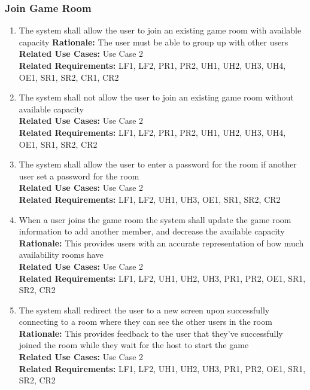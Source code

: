 \documentclass[12pt]{article}
\begin{document}
\subsubsection{Join Game Room}
\begin{enumerate}[label=JG\arabic*., series=JoinGame]
	\item The system shall allow the user to join an existing game room with available capacity \newline 
    \textbf{Rationale:} The user must be able to group up with other users\\
    \textbf{Related Use Cases:} Use Case 2\\
    \textbf{Related Requirements:} LF1, LF2, PR1, PR2, UH1, UH2, UH3, UH4, OE1, SR1, SR2, CR1, CR2
    
    \item The system shall not allow the user to join an existing game room without available capacity\\
    \textbf{Related Use Cases:} Use Case 2\\
    \textbf{Related Requirements:} LF1, LF2, PR1, PR2, UH1, UH2, UH3, UH4, OE1, SR1, SR2, CR2
    
    \item The system shall allow the user to enter a password for the room if another user set a password for the room\\
    \textbf{Related Use Cases:} Use Case 2\\
    \textbf{Related Requirements:} LF1, LF2, UH1, UH3, OE1, SR1, SR2, CR2
    \item When a user joins the game room the system shall update the game room information to add another member, and decrease the available capacity\\
    \textbf{Rationale:} This provides users with an accurate representation of how much availability rooms have\\
    \textbf{Related Use Cases:} Use Case 2\\
    \textbf{Related Requirements:} LF1, LF2, UH1, UH2, UH3, PR1, PR2, OE1, SR1, SR2, CR2
    
    \item The system shall redirect the user to a new screen upon successfully connecting to a room where they can see the other users in the room\newline 
    \textbf{Rationale:} This provides feedback to the user that they've successfully joined the room while they wait for the host to start the game\\
    \textbf{Related Use Cases:} Use Case 2\\
    \textbf{Related Requirements:} LF1, LF2, UH1, UH2, UH3, PR1, PR2, OE1, SR1, SR2, CR2
\end{enumerate}
\end{document}
